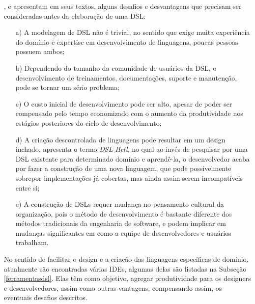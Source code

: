 ,  e  apresentam em seus textos, alguns desafios e desvantagens que precisam ser consideradas antes da elaboração de uma \gls{DSL}:

\begin{enumerate}
    \item[a)] A modelagem de \gls{DSL} não é trivial, no sentido que exige muita experiência do domínio e expertise em desenvolvimento de linguagens, poucas pessoas possuem ambos;
    \item[b)] Dependendo do tamanho da comunidade de usuários da \gls{DSL}, o desenvolvimento de treinamentos, documentações, suporte e manutenção, pode se tornar um sério problema;
    \item[c)] O custo inicial de desenvolvimento pode ser alto, apesar de poder ser compensado pelo tempo economizado com o aumento da produtividade nos estágios posteriores do ciclo de desenvolvimento;
    \item[d)] A criação descontrolada de linguagens pode resultar em um design inchado,  apresenta o termo \textit{DSL Hell}, no qual ao invés de pesquisar por uma \gls{DSL} existente para determinado domínio e aprendê-la, o desenvolvedor acaba por fazer a construção de uma nova linguagem, que pode possivelmente sobrepor implementações já cobertas, mas ainda assim serem incompatíveis entre si;
    \item[e)] A construção de \gls{DSL}s requer mudança no pensamento cultural da organização, pois o método de desenvolvimento é bastante diferente dos métodos tradicionais da engenharia de software, e podem implicar em mudanças significantes em como a equipe de desenvolvedores e usuários trabalham.
    
\end{enumerate}

No sentido de facilitar o design e a criação das linguagens específicas de domínio, atualmente são encontradas várias \gls{IDE}s, algumas delas são listadas na Subseção \ref{ferramentasdsl}. Elas têm como objetivo, agregar produtividade para os designers e desenvolvedores, assim como outras vantagens, compensando assim, os eventuais desafios descritos.



